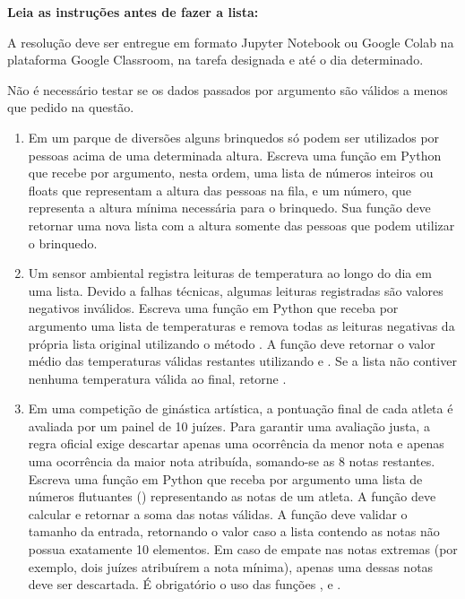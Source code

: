
\vspace{1cm}

\noindent  \textbf{Leia as instruções antes de fazer a lista:}

\vspace{0.3cm}
\noindent A resolução deve ser entregue em formato Jupyter Notebook ou Google Colab na plataforma Google Classroom, na tarefa designada e até o dia determinado.

\noindent  Não é necessário testar se os dados passados por argumento são válidos a menos que pedido na questão.


\vspace{0.5cm}


\begin{enumerate}[label=\textbf{Q\arabic*.}]


    \item Em um parque de diversões alguns brinquedos só podem ser utilizados por pessoas acima de uma determinada altura. Escreva uma função em Python que recebe por argumento, nesta ordem, uma lista de números inteiros ou floats que representam a altura das pessoas na fila, e um número, que representa a altura mínima necessária para o brinquedo. Sua função deve retornar uma nova lista com a altura somente das pessoas que podem utilizar o brinquedo.

    \item Um sensor ambiental registra leituras de temperatura ao longo do dia em uma lista. Devido a falhas técnicas, algumas leituras registradas são valores negativos inválidos. Escreva uma função em Python que receba por argumento uma lista de temperaturas e remova todas as leituras negativas da própria lista original utilizando o método . A função deve retornar o valor médio das temperaturas válidas restantes utilizando  e . Se a lista não contiver nenhuma temperatura válida ao final, retorne .

    \vspace{0.5cm}
    \item Em uma competição de ginástica artística, a pontuação final de cada atleta é avaliada por um painel de 10 juízes. Para garantir uma avaliação justa, a regra oficial exige descartar apenas uma ocorrência da menor nota e apenas uma ocorrência da maior nota atribuída, somando-se as 8 notas restantes. Escreva uma função em Python que receba por argumento uma lista de números flutuantes () representando as notas de um atleta. A função deve calcular e retornar a soma das notas válidas. A função deve validar o tamanho da entrada, retornando o valor  caso a lista contendo as notas não possua exatamente 10 elementos. Em caso de empate nas notas extremas (por exemplo, dois juízes atribuírem a nota mínima), apenas uma dessas notas deve ser descartada. É obrigatório o uso das funções ,  e .
    

\end{enumerate}
